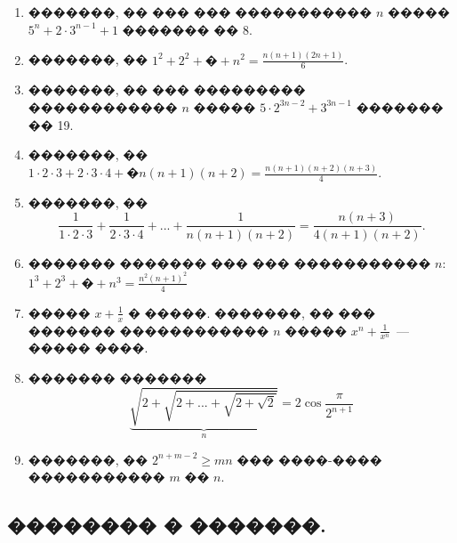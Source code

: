 \documentclass[a4paper,12pt]{article}
\begin{document}
\begin{enumerate}[resume]

\item �������, �� ��� ��� ����������� $n$ �����  $5^{n}+ 2\cdot 3^{n-1}+ 1$ ������� �� $8$.

\item �������, �� $1^{2}+ 2^{2}+ � + n^{2}= \frac{n (n + 1)(2n + 1)}{6}$.

\item �������, �� ��� ��������� ������������ $n$ ����� $5\cdot 2^{3n-2}+3^{3n-1}$ ������� �� 19.

\item �������, ��  $1\cdot 2\cdot 3 + 2\cdot 3\cdot 4 + � n (n + 1)(n + 2) = \frac{n (n + 1)(n + 2)(n + 3)}{4}.$

\item �������, �� $$\frac{1}{1\cdot 2\cdot3} + \frac{1}{2\cdot 3\cdot4}+...+\frac{1}{n(n+1)(n+2)} = \frac{n(n+3)}{4(n+1)(n+2)}.$$

\item ������� ������� ��� ��� ����������� $n$: $1^{3}+ 2^{3}+ � + n^{3}=\frac{n^{2}(n+1)^{2}}{4}$



\item ����� $x+\frac{1}{x}$ � �����. �������, �� ��� ������� ������������ $n$ ����� $x^{n}+\frac{1}{x^{n}}$~--- ����� ����.

\item ������� ������� $$\underbrace{\sqrt{2+\sqrt{2+...+\sqrt{2+\sqrt{2}}}}}_{n}=2\cos\frac{\pi}{2^{n+1}}$$

\item �������, �� $2^{n+m-2}\geq mn$ ��� ����-���� ����������� $m$ �� $n$.
\end{enumerate}








\newpage

\begin{center}
\section*{�������� � �������.}
\end{center}

\medskip\medskip\medskip
\end{document}
